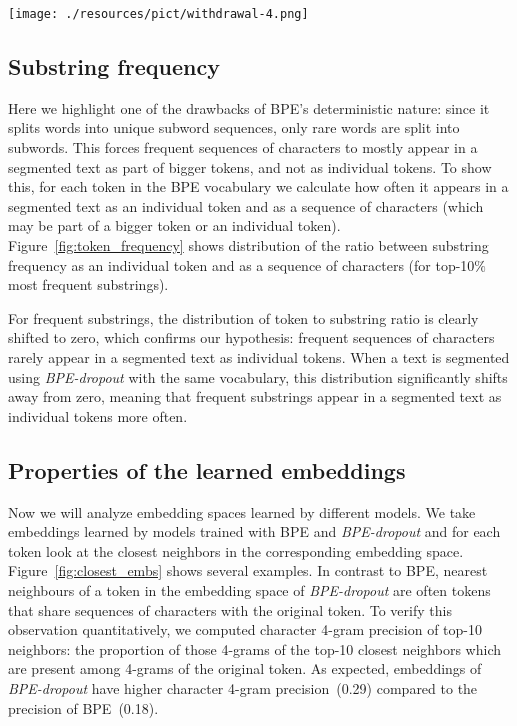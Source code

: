 \documentclass[11pt,a4paper]{article}
\begin{document}
\begin{figure*}[t!]
    \centering
    \texttt{[image: ./resources/pict/withdrawal-4.png]}
    \caption{Examples of nearest neighbours in the source embedding space of models trained with BPE and \textit{BPE-dropout}. Models trained on WMT14 En-Fr (4m).}
    \label{fig:closest_embs}
\end{figure*} 

\subsection{Substring frequency}

Here we highlight one of the drawbacks of BPE's deterministic nature: since it splits words into unique subword sequences, only rare words are split into subwords. This forces frequent sequences of characters to mostly appear in a segmented text as part of bigger tokens, and not as individual tokens. To show this, for each token in the BPE vocabulary we calculate how often it appears in a segmented text as an individual token and as a sequence of characters (which may be part of a bigger token or an individual token). Figure~\ref{fig:token_frequency} shows distribution of the ratio between substring frequency as an individual token and as a sequence of characters (for top-10$\%$ most frequent substrings).

For frequent substrings, the distribution of token to substring ratio is clearly shifted to zero, which confirms our hypothesis: frequent sequences of characters rarely appear in a segmented text as individual tokens. When a text is segmented using \textit{BPE-dropout} with the same vocabulary, this distribution significantly shifts away from zero, meaning that frequent substrings appear in a segmented text as individual tokens more often. 




\subsection{Properties of the learned embeddings}



    

Now we will analyze embedding spaces learned by different models.
We take embeddings learned by models trained with BPE and \textit{BPE-dropout} and for each token look at the closest neighbors in the corresponding embedding space.
Figure~\ref{fig:closest_embs} shows several examples. In contrast to BPE, nearest neighbours of a token in the embedding space of \textit{BPE-dropout} are often tokens that share sequences of characters with the original token. To verify this observation quantitatively, we computed character 4-gram precision of top-10 neighbors: the proportion of those 4-grams of the top-10 closest neighbors which are present among 4-grams of the original token. As expected, embeddings of \textit{BPE-dropout} have higher character 4-gram precision~(0.29) compared to the precision of BPE~(0.18).
\end{document}
